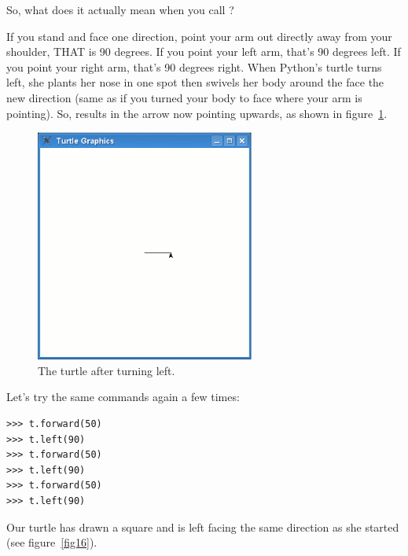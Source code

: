 So, what does it actually mean when you call ?
\par
If you stand and face one direction, point your arm out directly away from your shoulder, THAT is 90 degrees.  If you point your left arm, that's 90 degrees left.  If you point your right arm, that's 90 degrees right.  When Python's turtle turns left, she plants her nose in one spot then swivels her body around the face the new direction (same as if you turned your body to face where your arm is pointing).  So,  results in the arrow now pointing upwards, as shown in figure~\ref{fig15}.

\begin{figure}
\begin{center}
\includegraphics[width=72mm]{eps/figure15.eps}
\end{center}
\caption{The turtle after turning left.}\label{fig15}
\end{figure}

Let's try the same commands again a few times:

\begin{listing}
\begin{verbatim}
>>> t.forward(50)
>>> t.left(90)
>>> t.forward(50)
>>> t.left(90)
>>> t.forward(50)
>>> t.left(90)
\end{verbatim}
\end{listing}

Our turtle has drawn a square and is left facing the same direction as she started (see figure~\ref{fig16}).

